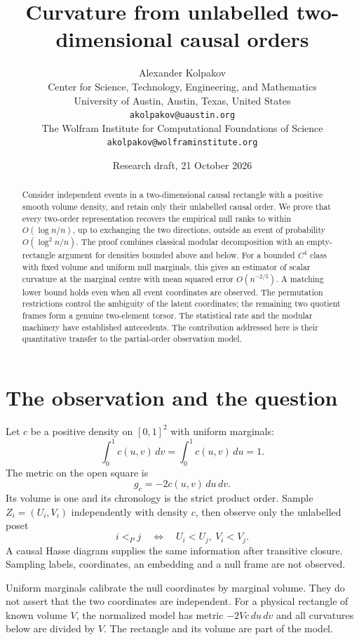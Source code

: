 \documentclass[11pt]{article}
\title{Curvature from unlabelled two-dimensional causal orders}
\author{Alexander Kolpakov\\[0.5ex]
\small Center for Science, Technology, Engineering, and Mathematics\\
\small University of Austin, Austin, Texas, United States\\
\small \texttt{akolpakov@uaustin.org}\\[0.75ex]
\small The Wolfram Institute for Computational Foundations of Science\\
\small \texttt{akolpakov@wolframinstitute.org}}
\date{Research draft, 21 October 2026}
\theoremstyle{remark}
\numberwithin{equation}{section}
\begin{document}
\maketitle
\begin{abstract}
Consider independent events in a two-dimensional causal rectangle with a
positive smooth volume density, and retain only their unlabelled causal
order. We prove that every two-order representation recovers the empirical
null ranks to within $O(\log n/n)$, up to exchanging the two directions,
outside an event of probability $O(\log^2 n/n)$.
The proof combines classical modular decomposition with an empty-rectangle
argument for densities bounded above and below.
For a bounded $C^4$ class with fixed volume and uniform null marginals,
this gives an estimator of scalar curvature at the marginal centre with
mean squared error $O(n^{-2/5})$. A matching lower bound holds even
when all event coordinates are observed.
The permutation restrictions control the ambiguity of the latent
coordinates; the remaining two quotient frames form a genuine
two-element torsor. The statistical rate and the modular machinery
have established antecedents. The contribution addressed here is
their quantitative transfer to the partial-order observation model.
\end{abstract}

\section{The observation and the question}
Let $c$ be a positive density on $[0,1]^2$ with uniform marginals:
\begin{equation}\label{eq:copula}
 \int_0^1c(u,v)\,dv=\int_0^1c(u,v)\,du=1.
\end{equation}
The metric on the open square is
\begin{equation}\label{eq:metric}
 g_c=-2c(u,v)\,du\,dv.
\end{equation}
Its volume is one and its chronology is the strict product order.
Sample $Z_i=(U_i,V_i)$ independently with density $c$, then observe
only the unlabelled poset
\[
 i<_Pj\quad\Longleftrightarrow\quad U_i<U_j,\ V_i<V_j.
\]
A causal Hasse diagram supplies the same information after transitive
closure. Sampling labels, coordinates, an embedding and a null frame
are not observed.

Uniform marginals calibrate the null coordinates by marginal volume.
They do not assert that the two coordinates are independent.
For a physical rectangle of known volume $V$, the normalized model
has metric $-2Vc\,du\,dv$ and all curvatures below are divided by $V$.
The rectangle and its volume are part of the model.
\end{document}

